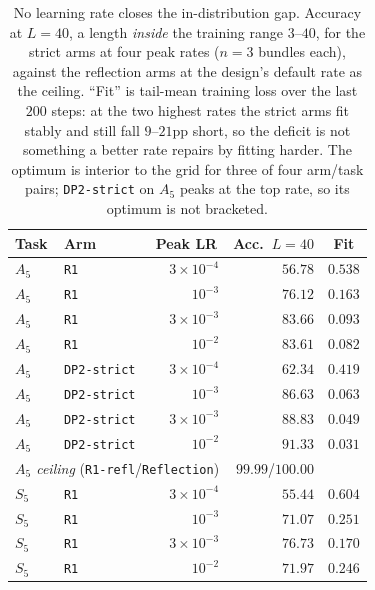 \documentclass[10pt,twocolumn]{article}
\newcommand{\hd}[1]{\multicolumn{1}{c}{#1}}
\begin{document}
\begin{table}[t]
\centering
\small
\caption{No learning rate closes the in-distribution gap. Accuracy at $L=40$,
a length \emph{inside} the training range $3$--$40$, for the strict arms at four
peak rates ($n=3$ bundles each), against the reflection arms at the design's
default rate as the ceiling. ``Fit'' is tail-mean training loss over the last $200$ steps:
at the two highest rates the strict arms fit stably and still fall $9$--$21$pp
short, so the deficit is not something a better rate repairs by fitting harder.
The optimum is interior to the grid for three of four arm/task pairs;
\texttt{DP2-strict} on $A_5$ peaks at the top rate, so its optimum is not
bracketed.}
\label{tab:lrgap}
\begin{tabular}{llrrr}
\toprule
Task & Arm & \hd{Peak LR} & \hd{Acc.\ $L{=}40$} & \hd{Fit} \\
\midrule
$A_5$ & \texttt{R1}         & $3\!\times\!10^{-4}$ & $56.78$ & $0.538$ \\
$A_5$ & \texttt{R1}         & $10^{-3}$            & $76.12$ & $0.163$ \\
$A_5$ & \texttt{R1}         & $3\!\times\!10^{-3}$ & $83.66$ & $0.093$ \\
$A_5$ & \texttt{R1}         & $10^{-2}$            & $83.61$ & $0.082$ \\
$A_5$ & \texttt{DP2-strict} & $3\!\times\!10^{-4}$ & $62.34$ & $0.419$ \\
$A_5$ & \texttt{DP2-strict} & $10^{-3}$            & $86.63$ & $0.063$ \\
$A_5$ & \texttt{DP2-strict} & $3\!\times\!10^{-3}$ & $88.83$ & $0.049$ \\
$A_5$ & \texttt{DP2-strict} & $10^{-2}$            & $91.33$ & $0.031$ \\
\cmidrule(lr){1-5}
\multicolumn{3}{l}{\emph{$A_5$ ceiling} (\texttt{R1-refl}/\texttt{Reflection})}
  & $99.99$/$100.00$ & \\
\midrule
$S_5$ & \texttt{R1}         & $3\!\times\!10^{-4}$ & $55.44$ & $0.604$ \\
$S_5$ & \texttt{R1}         & $10^{-3}$            & $71.07$ & $0.251$ \\
$S_5$ & \texttt{R1}         & $3\!\times\!10^{-3}$ & $76.73$ & $0.170$ \\
$S_5$ & \texttt{R1}         & $10^{-2}$            & $71.97$ & $0.246$ \\

\end{tabular}
\end{table}
\end{document}
